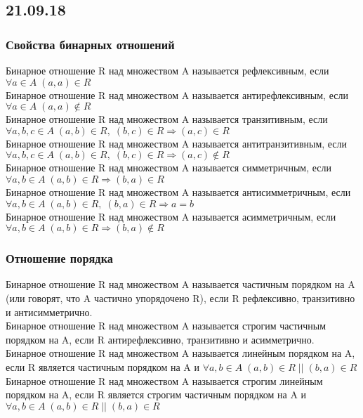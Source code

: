 \subsection{21.09.18}
\subsubsection{Свойства бинарных отношений}
Бинарное отношение R над множеством A называется рефлексивным, если $\forall a \in A \; (a, a) \in R$\\
Бинарное отношение R над множеством A называется антирефлексивным, если $\forall a \in A \; (a, a) \not\in R$\\
Бинарное отношение R над множеством A называется транзитивным, если $\forall a, b, c \in A \; (a, b) \in R, \; (b, c) \in R \Rightarrow (a, c) \in R$\\
Бинарное отношение R над множеством A называется антитранзитивным, если $\forall a, b, c \in A \; (a, b) \in R, \; (b, c) \in R \Rightarrow (a, c) \not\in R$\\
Бинарное отношение R над множеством A называется симметричным, если $\forall a, b \in A \; (a, b) \in R \Rightarrow (b, a) \in R$\\
Бинарное отношение R над множеством A называется антисимметричным, если $\forall a, b \in A \; (a, b) \in R, \; (b, a) \in R \Rightarrow a = b$\\
Бинарное отношение R над множеством A называется асимметричным, если $\forall a, b \in A \; (a, b) \in R \Rightarrow (b, a) \not\in R$\\
\subsubsection{Отношение порядка}
Бинарное отношение R над множеством A называется частичным порядком на A (или говорят, что A частично упорядочено R), если R рефлексивно, транзитивно и антисимметрично.\\
Бинарное отношение R над множеством A называется строгим частичным порядком на A, если R антирефлексивно, транзитивно и асимметрично.\\
Бинарное отношение R над множеством A называется линейным порядком на A, если R является частичным порядком на A и $\forall a, b \in A \; (a, b) \in R \; || \; (b, a) \in R$\\
Бинарное отношение R над множеством A называется строгим линейным порядком на A, если R является строгим частичным порядком на A и $\forall a, b \in A \; (a, b) \in R \; || \; (b, a) \in R$\\
